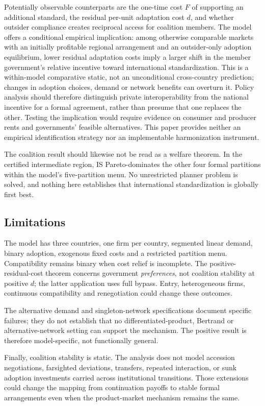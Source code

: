 Potentially observable counterparts are the one-time cost $F$ of supporting an additional standard, the residual per-unit adaptation cost $d$, and whether outsider compliance creates reciprocal access for coalition members. The model offers a conditional empirical implication: among otherwise comparable markets with an initially profitable regional arrangement and an outsider-only adoption equilibrium, lower residual adaptation costs imply a larger shift in the member government's relative incentive toward international standardization. This is a within-model comparative static, not an unconditional cross-country prediction; changes in adoption choices, demand or network benefits can overturn it. Policy analysis should therefore distinguish private interoperability from the national incentive for a formal agreement, rather than presume that one replaces the other. Testing the implication would require evidence on consumer and producer rents and governments' feasible alternatives. This paper provides neither an empirical identification strategy nor an implementable harmonization instrument.

The coalition result should likewise not be read as a welfare theorem. In the certified intermediate region, IS Pareto-dominates the other four formal partitions within the model's five-partition menu. No unrestricted planner problem is solved, and nothing here establishes that international standardization is globally first best.

\subsection{Limitations}
\label{subsec:discussion-limitations}

The model has three countries, one firm per country, segmented linear demand, binary adoption, exogenous fixed costs and a restricted partition menu. Compatibility remains binary when cost relief is incomplete. The positive-residual-cost theorem concerns government \emph{preferences}, not coalition stability at positive $d$; the latter application uses full bypass. Entry, heterogeneous firms, continuous compatibility and renegotiation could change these outcomes.

The alternative demand and singleton-network specifications document specific failures; they do not establish that no differentiated-product, Bertrand or alternative-network setting can support the mechanism. The positive result is therefore model-specific, not functionally general.

Finally, coalition stability is static. The analysis does not model accession negotiations, farsighted deviations, transfers, repeated interaction, or sunk adoption investments carried across institutional transitions. Those extensions could change the mapping from continuation payoffs to stable formal arrangements even when the product-market mechanism remains the same.


